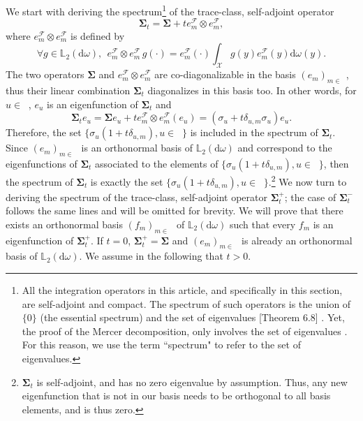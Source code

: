\documentclass[twoside,11pt]{book}
\numberwithin{theorem}{chapter}
\numberwithin{definition}{chapter}
\numberwithin{proposition}{chapter}
\numberwithin{corollary}{chapter}
\numberwithin{example}{chapter}
\numberwithin{lemma}{chapter}
\numberwithin{assumption}{chapter}
\numberwithin{equation}{chapter}
\numberwithin{figure}{chapter}
\DeclareMathOperator{\F}{\mathcal{F}}
\DeclareMathOperator{\X}{\mathcal{X}}
\def\Ltwo{\mathbb{L}_{2}(\mathrm{d} \omega)}
\DeclareMathOperator{\Ns}{\mathbb{N}^{*}}
\newcommand{\ab}[1]{\textcolor{red}{#1}}
\begin{document}
We start with deriving the spectrum\footnote{
All the integration operators in this article, and specifically in this section, are self-adjoint and compact. The spectrum of such operators is the union of $\{0\}$ (the essential spectrum) and the set of eigenvalues \citep{Bre10}[Theorem 6.8] . Yet, the proof of the Mercer decomposition, only involves the set of eigenvalues \citep{StSc12}. For this reason, we use the term ``spectrum" to refer to the set of eigenvalues.} of the trace-class, self-adjoint operator
\begin{equation}
\bm{\Sigma}_{t} = \bm{\Sigma} + t e_{m}^{\F} \otimes e_{m}^{\F},
\end{equation}
where $e_{m}^{\F} \otimes e_{m}^{\F}$ is defined by
\begin{equation}
\forall g \in \Ltwo, \:\: e_{m}^{\F} \otimes e_{m}^{\F} \,g(\cdot) = e_{m}^{\F}(\cdot) \int_{\X}g(y)e_{m}^{\F}(y) \mathrm{d}\omega(y).
\end{equation}
The two operators $\bm{\Sigma}$ and $e_{m}^{\F} \otimes e_{m}^{\F}$ are co-diagonalizable in the basis $(e_{m})_{m \in \Ns}$, thus their linear combination $\bm{\Sigma}_{t}$ diagonalizes in this basis too. In other words, for $u \in \Ns$, $e_{u}$ is an eigenfunction of $\bm{\Sigma}_{t}$ and
\begin{equation}
\bm{\Sigma}_{t} e_{u} = \bm{\Sigma} e_{u} + t e_{m}^{\F} \otimes e_{m}^{\F} (e_{u}) = (\sigma_{u} + t \delta_{u,m} \sigma_{u}) e_{u}.
\end{equation}
Therefore, the set $\{\sigma_{u}(1+t\delta_{u,m}), u \in \Ns\}$ is included in the spectrum of $\bm{\Sigma}_t$. Since $(e_{m})_{m \in \Ns}$ is an orthonormal basis of $\Ltwo$ and correspond to the eigenfunctions of $\bm{\Sigma}_{t}$ associated to the elements of $\{\sigma_{u}(1+t\delta_{u,m}), u \in \Ns\}$, then the spectrum of $\bm{\Sigma}_t$ is exactly the set $\{\sigma_{u}(1+t\delta_{u,m}), u \in \Ns\}$.\footnote{$\bm{\Sigma}_{t}$ is self-adjoint, and has no zero eigenvalue by assumption. Thus, any new eigenfunction that is not in our basis needs to be orthogonal to all basis elements, and is thus zero.}
We now turn to deriving the spectrum of the trace-class, self-adjoint operator $\bm{\Sigma}_{t}^{+}$; the case of $\bm{\Sigma}_{t}^{-}$ follows the same lines and will be omitted for brevity.
We will prove that there exists an orthonormal basis $(f_{m})_{m \in \Ns}$ of $\Ltwo$ such that every $f_m$ is an eigenfunction of $\bm{\Sigma}_{t}^{+}$. If $t=0$, $\bm{\Sigma}_{t}^{+} = \bm{\Sigma}$ and $(e_{m})_{m \in \Ns}$ is already an orthonormal basis of $\Ltwo$. We assume in the following that $t>0$.
\end{document}
